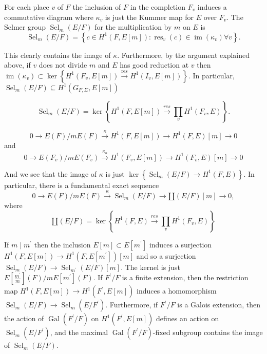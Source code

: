 \documentclass[leqno]{amsart}
\DeclareMathOperator{\Sel}{Sel}
\newcommand{\1}{\mathbf{1}}
\DeclareMathOperator{\res}{res}
\theoremstyle{definition}
\theoremstyle{remark}
\begin{document}
For each place $v$ of $F$ the inclusion of $F$ in the completion $F_v$ induces a commutative diagram
where $\kappa_v$ is just the Kummer map for $E$ over $F_v$. The Selmer group $\Sel_m(E / F)$ for the multiplication by $m$ on $E$ is
\[
\Sel_m(E / F)=\left\{c \in H^1(F, E[m]): \res_v(c) \in \operatorname{im}\left(\kappa_v\right) \forall v\right\} .
\]

This clearly contains the image of $\kappa$. Furthermore, by the argument explained above, if $v$ does not divide $m$ and $E$ has good reduction at $v$ then $\operatorname{im}\left(\kappa_v\right) \subset \ker\left\{H^1\left(F_v, E[m]\right) \xrightarrow{\res} H^1\left(I_v, E[m]\right)\right\}$. In particular, $\Sel_m(E / F) \subseteq H^1\left(G_{F, \Sigma}, E[m]\right)$

\[
\operatorname{Sel}_m(E / F)=\operatorname{ker}\left\{H^1(F, E[m]) \xrightarrow{r e s} \prod_v H^1\left(F_v, E\right)\right\} .
\]

\[
0 \rightarrow E(F) / m E(F) \xrightarrow{\kappa} H^1(F, E[m]) \rightarrow H^1(F, E)[m] \rightarrow 0
\]
and
\[
0 \rightarrow E\left(F_v\right) / m E\left(F_v\right) \xrightarrow{\kappa_u} H^1\left(F_v, E[m]\right) \rightarrow H^1\left(F_v, E\right)[m] \rightarrow 0
\]

And we see that the image of $\kappa$ is just $\operatorname{ker}\left\{\operatorname{Sel}_m(E / F) \rightarrow H^1(F, E)\right\}$. In particular, there is a fundamental exact sequence
\[
0 \rightarrow E(F) / m E(F) \xrightarrow{\kappa} \operatorname{Sel}_m(E / F) \rightarrow \amalg(E / F)[m] \rightarrow 0,
\]
where
\[
\amalg(E / F)=\operatorname{ker}\left\{H^1(F, E) \xrightarrow{r e s} \prod_v H^1\left(F_v, E\right)\right\}
\]

If $m \mid m^{\prime}$ then the inclusion $E[m] \subset E\left[m^{\prime}\right]$ induces a surjection $H^1(F, E[m]) \rightarrow H^1\left(F, E\left[m^{\prime}\right]\right)[m]$ and so a surjection $\operatorname{Sel}_m(E / F) \rightarrow \operatorname{Sel}_{m^{\prime}}(E / F)[m]$. The kernel is just $E\left[\frac{m^{\prime}}{m}\right](F) / m E\left[m^{\prime}\right](F)$. If $F^{\prime} / F$ is a finite extension, then the restriction map $H^1(F, E[m]) \rightarrow H^1\left(F^{\prime}, E[m]\right)$ induces a homomorphism $\operatorname{Sel}_m(E / F) \rightarrow \operatorname{Sel}_m\left(E / F^{\prime}\right)$. Furthermore, if $F^{\prime} / F$ is a Galois extension, then the action of $\operatorname{Gal}\left(F^{\prime} / F\right)$ on $H^1\left(F^{\prime}, E[m]\right)$ defines an action on $\operatorname{Sel}_m\left(E / F^{\prime}\right)$, and the maximal $\operatorname{Gal}\left(F^{\prime} / F\right)$-fixed subgroup contains the image of $\operatorname{Sel}_m(E / F)$.
\end{document}
